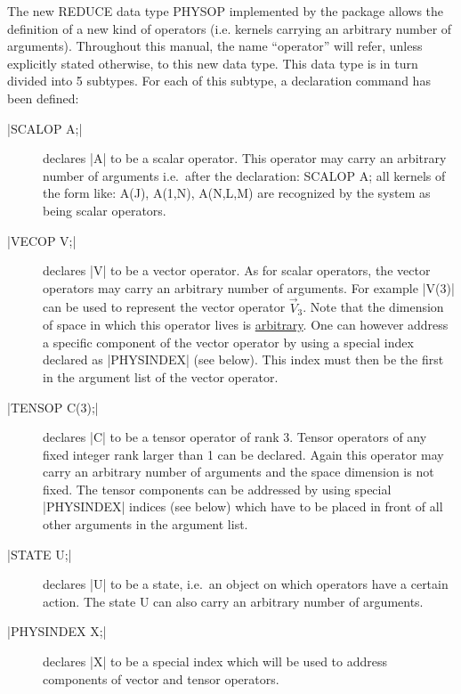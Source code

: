 The new REDUCE data type PHYSOP implemented by the package allows the
definition of a new kind of operators (i.e. kernels carrying
an arbitrary
number of arguments). Throughout this manual, the name
``operator''
will refer, unless explicitly stated otherwise, to this new data type.
This data type is in turn
divided into 5 subtypes. For each of this subtype, a declaration command
has been defined:
\begin{description}
\item[|SCALOP A;| ]  declares |A| to be a scalar
operator. This operator may
carry an arbitrary number of arguments i.e.\ after the
declaration:
\begintt
SCALOP A;
\endtt
all kernels of the form like:
\begintt
A(J), A(1,N), A(N,L,M)
\endtt
are recognized by the system as being scalar operators.

\item[|VECOP V;| ]  declares |V| to be a vector operator.
As for scalar operators, the vector operators may carry an arbitrary
number of arguments. For example |V(3)| can be used to represent
the vector operator $\vec{V}_{3}$. Note that the dimension of space
in which this operator lives is \underline{arbitrary}.
One can however address a specific component of the
vector operator by using a special index declared as |PHYSINDEX| (see
below). This index must then be the first in the argument list
of the vector operator.

\item[|TENSOP C(3);| ]  
declares |C| to be a tensor operator of rank 3. Tensor operators
of any fixed integer rank larger than 1 can be declared.
Again this operator may carry an arbitrary number of arguments
and the space dimension is not fixed.
The tensor
components can be addressed by using  special |PHYSINDEX| indices
(see below) which have to be placed in front of all other
arguments in the argument list.


\item[|STATE U;| ]  declares |U| to be a state, i.e.\ an
object on
which operators have a certain action.  The state  U can also carry an
arbitrary number of arguments.

\item[|PHYSINDEX X;| ]  declares |X| to be a special
index which will be used
to address components of vector and tensor operators.
\end{description}

